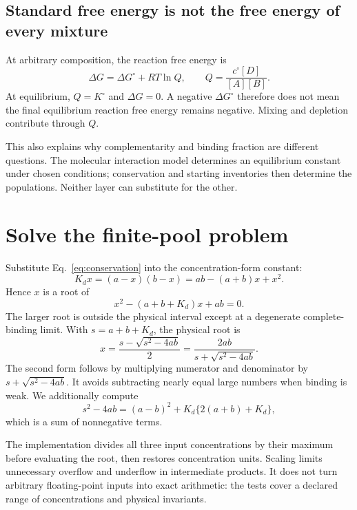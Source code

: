 \subsection{Standard free energy is not the free energy of every mixture}

At arbitrary composition, the reaction free energy is
\begin{equation}
\Delta G=\Delta G^\circ+RT\ln Q,\qquad
Q=\frac{c^\circ[D]}{[A][B]}.
\end{equation}
At equilibrium, $Q=K^\circ$ and $\Delta G=0$. A negative
$\Delta G^\circ$ therefore does not mean the final equilibrium reaction
free energy remains negative. Mixing and depletion contribute through $Q$.

This also explains why complementarity and binding fraction are different
questions. The molecular interaction model determines an equilibrium
constant under chosen conditions; conservation and starting inventories
then determine the populations. Neither layer can substitute for the other.

\section{Solve the finite-pool problem}

Substitute Eq.~\ref{eq:conservation} into the concentration-form constant:
\begin{equation}
K_dx=(a-x)(b-x)
       =ab-(a+b)x+x^2.
\end{equation}
Hence $x$ is a root of
\begin{equation}
x^2-(a+b+K_d)x+ab=0.
\end{equation}
The larger root is outside the physical interval except at a degenerate
complete-binding limit. With $s=a+b+K_d$, the physical root is
\begin{equation}
x=\frac{s-\sqrt{s^2-4ab}}{2}
 =\frac{2ab}{s+\sqrt{s^2-4ab}}.
\label{eq:root}
\end{equation}
The second form follows by multiplying numerator and denominator by
$s+\sqrt{s^2-4ab}$. It avoids subtracting nearly equal large numbers when
binding is weak. We additionally compute
\begin{equation}
s^2-4ab=(a-b)^2+K_d\{2(a+b)+K_d\},
\end{equation}
which is a sum of nonnegative terms.


The implementation divides all three input concentrations by their maximum
before evaluating the root, then restores concentration units. Scaling limits
unnecessary overflow and underflow in intermediate products. It does not
turn arbitrary floating-point inputs into exact arithmetic: the tests cover
a declared range of concentrations and physical invariants.

